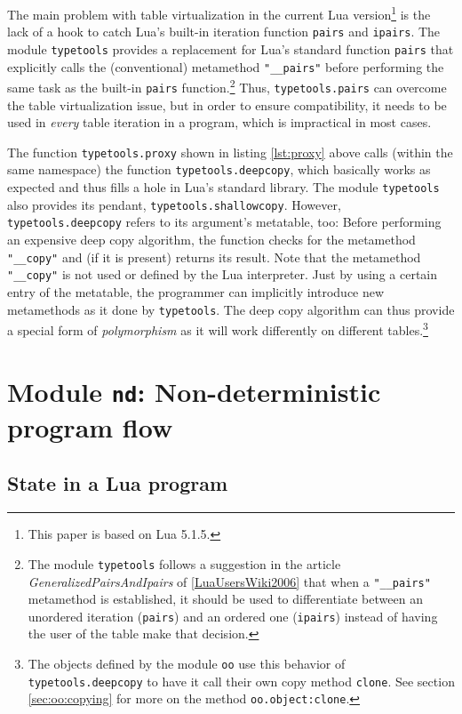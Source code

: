 The main problem with table virtualization in the current Lua version\footnote{This paper is based on Lua 5.1.5.} is the lack of a hook to catch Lua's built-in iteration function \texttt{pairs} and \texttt{ipairs}. The module \texttt{typetools} provides a replacement for Lua's standard function \texttt{pairs} that explicitly calls the (conventional) metamethod \texttt{"\_\_pairs"} before performing the same task as the built-in \texttt{pairs} function.\footnote{The module \texttt{typetools} follows a suggestion in the article \emph{GeneralizedPairsAndIpairs} of \ref{LuaUsersWiki2006} that when a \texttt{"\_\_pairs"} metamethod is established, it should be used to differentiate between an unordered iteration (\texttt{pairs}) and an ordered one (\texttt{ipairs}) instead of having the user of the table make that decision.} Thus, \texttt{typetools.pairs} can overcome the table virtualization issue, but in order to ensure compatibility, it needs to be used in \emph{every} table iteration in a program, which is impractical in most cases.

The function \texttt{typetools.proxy} shown in listing \ref{lst:proxy} above calls (within the same namespace) the function \texttt{typetools.deepcopy}, which basically works as expected and thus fills a hole in Lua's standard library. The module \texttt{typetools} also provides its pendant, \texttt{typetools.shallowcopy}. However, \texttt{typetools.deepcopy} refers to its argument's metatable, too: Before performing an expensive deep copy algorithm, the function checks for the metamethod \texttt{"\_\_copy"} and (if it is present) returns its result. Note that the metamethod \texttt{"\_\_copy"} is not used or defined by the Lua interpreter. Just by using a certain entry of the metatable, the programmer can implicitly introduce new metamethods as it done by \texttt{typetools}. The deep copy algorithm can thus provide a special form of \emph{polymorphism} as it will work differently on different tables.\footnote{The objects defined by the module \texttt{oo} use this behavior of \texttt{typetools.deepcopy} to have it call their own copy method \texttt{clone}. See section \ref{sec:oo:copying} for more on the method \texttt{oo.object:clone}.}


\section{Module \texttt{nd}: Non-deterministic program flow}
\label{sec:tools:nd}

\subsection{State in a Lua program}

